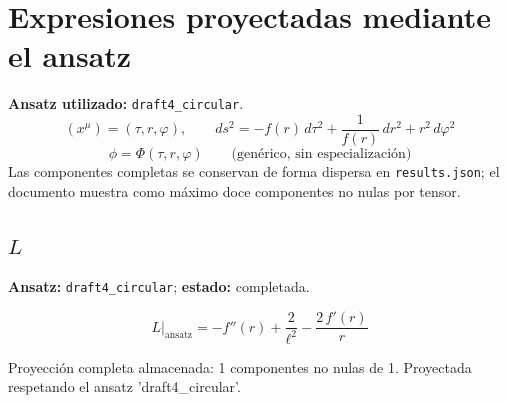 \documentclass[11pt]{article}
\begin{document}
\section*{Expresiones proyectadas mediante el ansatz}
\textbf{Ansatz utilizado:} \texttt{draft4\_circular}.
\begin{dmath*}[breakdepth={3}]
(x^\mu)=\left(\tau, r, \varphi\right),\qquad ds^2 = -f\!\left(r\right)\,d\tau^2 + \frac{1}{f\!\left(r\right)}\,dr^2 + {r}^{2}\,d\varphi^2
\end{dmath*}
\begin{dmath*}[breakdepth={3}]
\phi = \Phi\!\left(\tau, r, \varphi\right)\qquad\text{(genérico, sin especialización)}
\end{dmath*}
Las componentes completas se conservan de forma dispersa en \texttt{results.json}; el documento muestra como máximo doce componentes no nulas por tensor.
\subsection*{$ L $}
\textbf{Ansatz:} \texttt{draft4\_circular}; \textbf{estado:} completada.\par
\begin{dmath*}[breakdepth={5}]
L\big|_{\mathrm{ansatz}} = -f''\!\left(r\right) + \frac{2}{{\ell}^{2}} - \frac{2\,f'\!\left(r\right)}{r}
\end{dmath*}
\par\smallskip
Proyección completa almacenada: 1 componentes no nulas de 1. Proyectada respetando el ansatz 'draft4\_circular'.\par\medskip
{}
\end{document}
